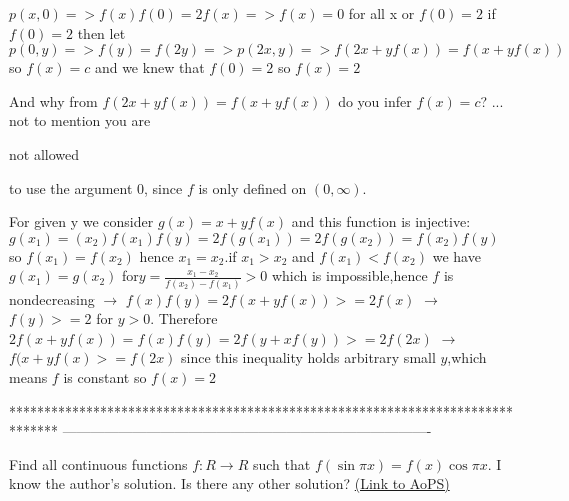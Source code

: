\begin{solution}
	$ p(x,0) => f(x)f(0)=2f(x) => f(x)=0$ for all x or $ f(0)=2 $
if $f(0)=2$ then let $ p(0,y) => f(y)=f(2y) => p(2x,y) => f(2x+yf(x))=f(x+yf(x))$ so $ f(x)=c $ and we knew that $ f(0)=2 $ so $f(x)=2$
\end{solution}



\begin{solution}
	And why from $f(2x+yf(x))=f(x+yf(x))$ do you infer $ f(x)=c $? ... not to mention you are \begin{bolded}not allowed \end{bolded}to use the argument $0$, since $f$ is only defined on $(0,\infty)$.
\end{solution}



\begin{solution}
	For given y we consider $g(x)=x+yf(x)$ and this function is injective:  $g(x_1)=(x_2)  f(x_1)f(y)=2f(g(x_1))=2f(g(x_2))=f(x_2)f(y)$ so $f(x_1)=f(x_2)$ hence $x_1=x_2$.if $x_1>x_2$ and $f(x_1)<f(x_2)$ we have $g(x_1)=g(x_2)$ for$y=\frac{x_1-x_2}{f(x_2)-f(x_1)}>0$ which is impossible,hence $f$ is nondecreasing $\to$ $f(x)f(y)=2f(x+yf(x))>=2f(x)$ $\to$ $f(y)>=2$ for $y>0$. Therefore $2f(x+yf(x))=f(x)f(y)=2f(y+xf(y))>=2f(2x)$ $\to$ $f(x+yf(x)>=f(2x)$ since this inequality holds arbitrary small $y$,which means $f$ is constant so $f(x)=2$
\end{solution}
*******************************************************************************
-------------------------------------------------------------------------------

\begin{problem}
	Find all continuous functions $f:R \rightarrow R$  such that $f(\sin{\pi}x)=f(x)\cos{\pi}x$. I know the author's solution. Is there any other solution?
	\flushright \href{https://artofproblemsolving.com/community/c6h561668}{(Link to AoPS)}
\end{problem}



